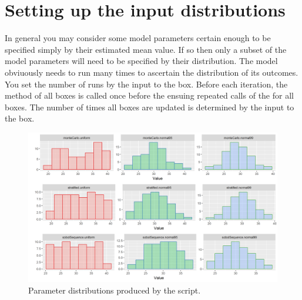\section{Setting up the input distributions}
In general you may consider some model parameters certain enough to be specified simply by their estimated mean value. If so then only a subset of the model parameters will need to be specified by their distribution. The model obviuously needs to run many times to ascertain the distribution of its outcomes. You set the number of runs by the  input to the  box. Before each iteration, the  method of all boxes is called once before the ensuing repeated calls of the  for all boxes. The number of times all boxes are updated is determined by the  input to the  box.

\begin{figure} [hb]
\centering
\includegraphics[width=\textwidth]{graphics/uncertainty-analysis-set-up}
\caption{Parameter distributions produced by the  script.}
\label{fig:uncertainty-analysis-set-up}
\end{figure}

